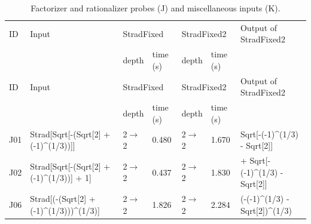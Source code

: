 \begin{longtable}{@{}p{}>{\ttfamily\footnotesize\raggedright\arraybackslash}p{}p{}p{}p{}p{}>{\ttfamily\footnotesize\raggedright\arraybackslash}p{}@{}}
\caption{Factorizer and rationalizer probes (J) and miscellaneous inputs (K).}\label{tab:cmpJK}\\
\toprule ID & Input & \multicolumn{2}{l}{StradFixed} & \multicolumn{2}{l}{StradFixed2} & Output of StradFixed2\\ & & depth & time (s) & depth & time (s) & \\\midrule\endfirsthead
\toprule ID & Input & \multicolumn{2}{l}{StradFixed} & \multicolumn{2}{l}{StradFixed2} & Output of StradFixed2\\ & & depth & time (s) & depth & time (s) & \\\midrule\endhead
\bottomrule\endfoot
J01 & Strad[\allowbreak{}Sqrt[\allowbreak{}-(\allowbreak{}Sqrt[\allowbreak{}2]\allowbreak{} +\allowbreak{} (\allowbreak{}-1)\allowbreak{}\textasciicircum{}\allowbreak{}(\allowbreak{}1/\allowbreak{}3)\allowbreak{})\allowbreak{}]\allowbreak{}]\allowbreak{} & 2$\to$2 & 0.480 & 2$\to$2 & 1.670 & Sqrt[\allowbreak{}-(\allowbreak{}-1)\allowbreak{}\textasciicircum{}\allowbreak{}(\allowbreak{}1/\allowbreak{}3)\allowbreak{} -\allowbreak{} Sqrt[\allowbreak{}2]\allowbreak{}]\allowbreak{}\\
J02 & Strad[\allowbreak{}Sqrt[\allowbreak{}-(\allowbreak{}Sqrt[\allowbreak{}2]\allowbreak{} +\allowbreak{} (\allowbreak{}-1)\allowbreak{}\textasciicircum{}\allowbreak{}(\allowbreak{}1/\allowbreak{}3)\allowbreak{})\allowbreak{}]\allowbreak{} +\allowbreak{} 1]\allowbreak{} & 2$\to$2 & 0.437 & 2$\to$2 & 1.830 & 1 +\allowbreak{} Sqrt[\allowbreak{}-(\allowbreak{}-1)\allowbreak{}\textasciicircum{}\allowbreak{}(\allowbreak{}1/\allowbreak{}3)\allowbreak{} -\allowbreak{} Sqrt[\allowbreak{}2]\allowbreak{}]\allowbreak{}\\
J06 & Strad[\allowbreak{}(\allowbreak{}-(\allowbreak{}Sqrt[\allowbreak{}2]\allowbreak{} +\allowbreak{} (\allowbreak{}-1)\allowbreak{}\textasciicircum{}\allowbreak{}(\allowbreak{}1/\allowbreak{}3)\allowbreak{})\allowbreak{})\allowbreak{}\textasciicircum{}\allowbreak{}(\allowbreak{}1/\allowbreak{}3)\allowbreak{}]\allowbreak{} & 2$\to$2 & 1.826 & 2$\to$2 & 2.284 & (\allowbreak{}-(\allowbreak{}-1)\allowbreak{}\textasciicircum{}\allowbreak{}(\allowbreak{}1/\allowbreak{}3)\allowbreak{} -\allowbreak{} Sqrt[\allowbreak{}2]\allowbreak{})\allowbreak{}\textasciicircum{}\allowbreak{}(\allowbreak{}1/\allowbreak{}3)\allowbreak{}\\

\end{longtable}
